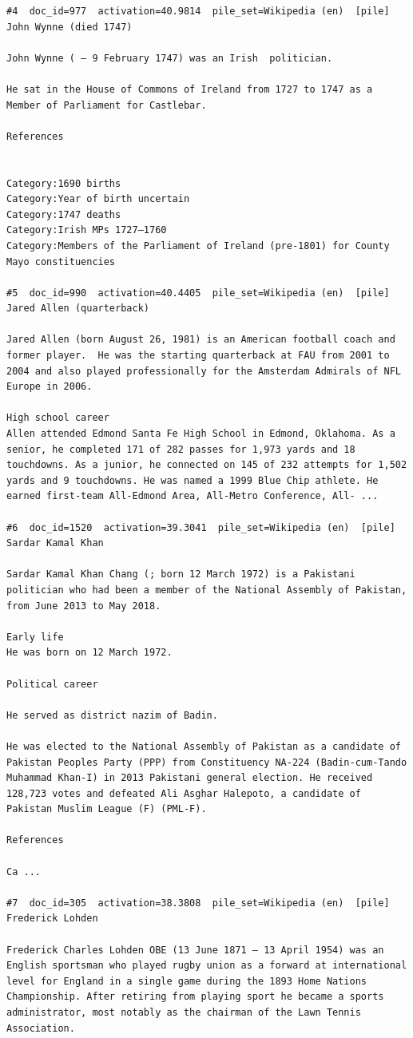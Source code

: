\begin{verbatim}
#4  doc_id=977  activation=40.9814  pile_set=Wikipedia (en)  [pile]
John Wynne (died 1747)

John Wynne ( – 9 February 1747) was an Irish  politician.

He sat in the House of Commons of Ireland from 1727 to 1747 as a Member of Parliament for Castlebar.

References 
 

Category:1690 births
Category:Year of birth uncertain
Category:1747 deaths
Category:Irish MPs 1727–1760
Category:Members of the Parliament of Ireland (pre-1801) for County Mayo constituencies

#5  doc_id=990  activation=40.4405  pile_set=Wikipedia (en)  [pile]
Jared Allen (quarterback)

Jared Allen (born August 26, 1981) is an American football coach and former player.  He was the starting quarterback at FAU from 2001 to 2004 and also played professionally for the Amsterdam Admirals of NFL Europe in 2006.

High school career 
Allen attended Edmond Santa Fe High School in Edmond, Oklahoma. As a senior, he completed 171 of 282 passes for 1,973 yards and 18 touchdowns. As a junior, he connected on 145 of 232 attempts for 1,502 yards and 9 touchdowns. He was named a 1999 Blue Chip athlete. He earned first-team All-Edmond Area, All-Metro Conference, All- ...

#6  doc_id=1520  activation=39.3041  pile_set=Wikipedia (en)  [pile]
Sardar Kamal Khan

Sardar Kamal Khan Chang (; born 12 March 1972) is a Pakistani politician who had been a member of the National Assembly of Pakistan, from June 2013 to May 2018.

Early life
He was born on 12 March 1972.

Political career

He served as district nazim of Badin.

He was elected to the National Assembly of Pakistan as a candidate of Pakistan Peoples Party (PPP) from Constituency NA-224 (Badin-cum-Tando Muhammad Khan-I) in 2013 Pakistani general election. He received 128,723 votes and defeated Ali Asghar Halepoto, a candidate of Pakistan Muslim League (F) (PML-F).

References

Ca ...

#7  doc_id=305  activation=38.3808  pile_set=Wikipedia (en)  [pile]
Frederick Lohden

Frederick Charles Lohden OBE (13 June 1871 – 13 April 1954) was an English sportsman who played rugby union as a forward at international level for England in a single game during the 1893 Home Nations Championship. After retiring from playing sport he became a sports administrator, most notably as the chairman of the Lawn Tennis Association.


\end{verbatim}
